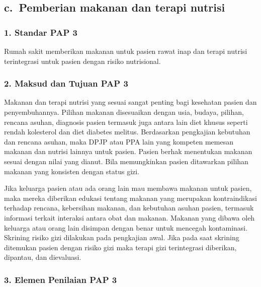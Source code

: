 \documentclass[
]{book}
\begin{document}
\hypertarget{c.-pemberian-makanan-dan-terapi-nutrisi}{%
\subsection*{c.~Pemberian makanan dan terapi nutrisi}\label{c.-pemberian-makanan-dan-terapi-nutrisi}}

\hypertarget{standar-pap-3}{%
\subsubsection*{1. Standar PAP 3}\label{standar-pap-3}}

Rumah sakit memberikan makanan untuk pasien rawat inap dan terapi nutrisi terintegrasi untuk pasien dengan risiko nutrisional.

\hypertarget{maksud-dan-tujuan-pap-3}{%
\subsubsection*{2. Maksud dan Tujuan PAP 3}\label{maksud-dan-tujuan-pap-3}}

Makanan dan terapi nutrisi yang sesuai sangat penting bagi kesehatan pasien dan penyembuhannya. Pilihan makanan disesuaikan dengan usia, budaya, pilihan, rencana asuhan, diagnosis pasien termasuk juga antara lain diet khusus seperti rendah kolesterol dan diet diabetes melitus. Berdasarkan pengkajian kebutuhan dan rencana asuhan, maka DPJP atau PPA lain yang kompeten memesan makanan dan nutrisi lainnya untuk pasien. Pasien berhak menentukan makanan sesuai dengan nilai yang dianut. Bila memungkinkan pasien ditawarkan pilihan makanan yang konsisten dengan status gizi.

Jika keluarga pasien atau ada orang lain mau membawa makanan untuk pasien, maka mereka diberikan edukasi tentang makanan yang merupakan kontraindikasi terhadap rencana, kebersihan makanan, dan kebutuhan asuhan pasien, termasuk informasi terkait interaksi antara obat dan makanan. Makanan yang dibawa oleh keluarga atau orang lain disimpan dengan benar untuk mencegah kontaminasi. Skrining risiko gizi dilakukan pada pengkajian awal. Jika pada saat skrining ditemukan pasien dengan risiko gizi maka terapi gizi terintegrasi diberikan, dipantau, dan dievaluasi.

\hypertarget{elemen-penilaian-pap-3}{%
\subsubsection*{3. Elemen Penilaian PAP 3}\label{elemen-penilaian-pap-3}}
\end{document}
